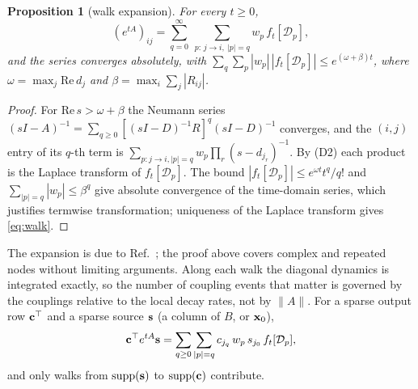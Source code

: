 \documentclass[aps,pra,superscriptaddress,floatfix,longbibliography,twocolumn]{revtex4-2}
\newcommand{\bx}{{\bf x}}
\newcommand{\bc}{{\bf c}}
\newcommand{\bs}{{\bf s}}
\newtheorem{proposition}{Proposition}
\begin{document}
\begin{proposition}[walk expansion]\label{prop:walk}
For every $t\ge0$,
\begin{equation}\label{eq:walk}
(e^{tA})_{ij}=\sum_{q=0}^{\infty}\ \sum_{p:\,j\to i,\ |p|=q} w_p\, f_t[\mathcal{D}_p],
\end{equation}
and the series converges absolutely, with $\sum_q\sum_{p}|w_p|\,|f_t[\mathcal{D}_p]|\le e^{(\omega+\beta)t}$, where $\omega=\max_j\mathrm{Re}\,d_j$ and $\beta=\max_i\sum_j|R_{ij}|$.
\end{proposition}
\begin{proof}
For $\mathrm{Re}\,s>\omega+\beta$ the Neumann series $(sI-A)^{-1}=\sum_{q\ge0}[(sI-D)^{-1}R]^q(sI-D)^{-1}$ converges, and the $(i,j)$ entry of its $q$-th term is $\sum_{p:j\to i,|p|=q}w_p\prod_r(s-d_{j_r})^{-1}$. By (D2) each product is the Laplace transform of $f_t[\mathcal{D}_p]$. The bound $|f_t[\mathcal{D}_p]|\le e^{\omega t}t^q/q!$ and $\sum_{|p|=q}|w_p|\le\beta^q$ give absolute convergence of the time-domain series, which justifies termwise transformation; uniqueness of the Laplace transform gives \eqref{eq:walk}.
\end{proof}
The expansion is due to Ref.~\cite{barash2022}; the proof above covers complex and repeated nodes without limiting arguments. Along each walk the diagonal dynamics is integrated exactly, so the number of coupling events that matter is governed by the couplings relative to the local decay rates, not by $\|A\|$. For a sparse output row $\bc^\top$ and a sparse source $\bs$ (a column of $B$, or $\bx_0$),
\begin{equation}\label{eq:io_walk}
\bc^\top e^{tA}\bs=\sum_{q\ge0}\sum_{|p|=q} c_{j_q}\,w_p\,s_{j_0}\,f_t[\mathcal{D}_p],
\end{equation}
and only walks from $\mathrm{supp}(\bs)$ to $\mathrm{supp}(\bc)$ contribute.
\end{document}
